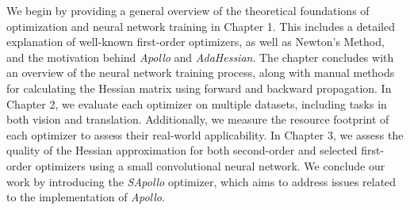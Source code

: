 We begin by providing a general overview of the theoretical foundations of optimization and neural network training in Chapter 1.
This includes a detailed explanation of well-known first-order optimizers, as well as Newton's Method, and the motivation behind \emph{Apollo} and \emph{AdaHessian}.
The chapter concludes with an overview of the neural network training process, along with manual methods for calculating the Hessian matrix using forward and backward propagation.
In Chapter 2, we evaluate each optimizer on multiple datasets, including tasks in both vision and translation.
Additionally, we measure the resource footprint of each optimizer to assess their real-world applicability.
In Chapter 3, we assess the quality of the Hessian approximation for both second-order and selected first-order optimizers using
a small convolutional neural network.
We conclude our work by introducing the \emph{SApollo} optimizer, which aims to address issues related to the implementation of \emph{Apollo}.


\vfill

\endgroup

\vfill
